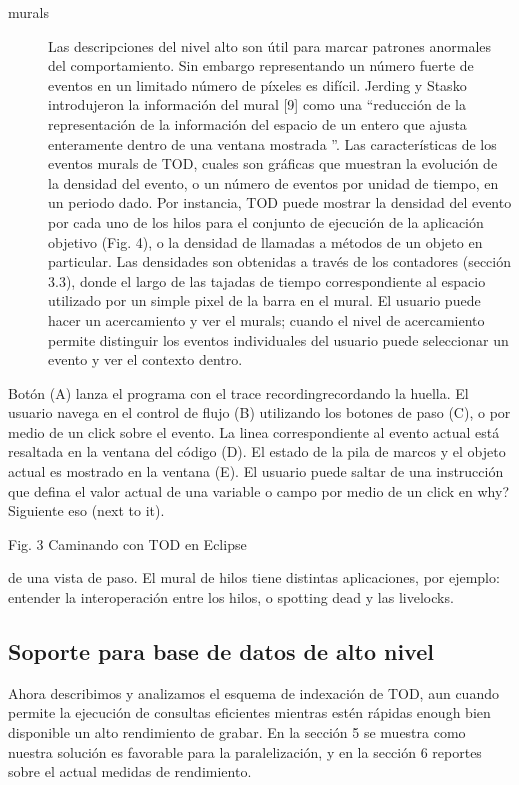\documentclass[12pt,legalpaper]{report}
\begin{document}
\begin{description}
	\item[murals] Las descripciones del nivel alto son útil para marcar patrones anormales del comportamiento.  Sin embargo representando un número fuerte de eventos en un limitado número de píxeles es difícil.  Jerding y Stasko introdujeron la información del mural [9] como una “reducción de la representación de la información del espacio de un entero que ajusta enteramente dentro de una ventana mostrada ”.  Las características de los eventos murals de TOD, cuales son gráficas que muestran la evolución de la densidad del evento, o un número de eventos por unidad de tiempo, en un periodo dado.  Por instancia, TOD puede mostrar la densidad del evento por cada uno de los hilos para el conjunto de ejecución de la aplicación objetivo (Fig. 4), o la densidad de llamadas a métodos de un objeto en particular.  Las densidades son obtenidas a través  de los contadores (sección 3.3), donde el largo de las tajadas de tiempo correspondiente al espacio utilizado por un simple pixel de la barra en el mural.  El usuario puede hacer un acercamiento y ver el murals;  cuando el nivel de acercamiento permite distinguir los eventos individuales del usuario puede seleccionar un evento y ver el contexto dentro.
\end{description}

Botón (A) lanza el programa con el trace recording{recordando la huella}.  El usuario navega en el control de flujo (B) utilizando los botones de paso (C), o por medio de un click sobre el evento.  La linea correspondiente al evento actual está resaltada en la ventana del código (D).  El estado de la pila de marcos y el objeto actual es mostrado en la ventana (E).  El usuario puede saltar de una instrucción que defina el valor actual de una variable o campo por medio de un click en why? Siguiente eso (next to it).


Fig. 3 Caminando con TOD en Eclipse

de una vista de paso.  El mural de hilos tiene distintas aplicaciones, por ejemplo: entender la interoperación entre los hilos, o spotting dead y las livelocks.

		\subsection{Soporte para base de datos de alto nivel}

Ahora describimos y analizamos el esquema de indexación de TOD, aun cuando permite la ejecución de consultas eficientes mientras estén rápidas enough {bien} disponible un alto rendimiento de grabar.  En la sección 5 se muestra como nuestra solución es favorable para la paralelización, y en la sección 6 reportes sobre el actual medidas de rendimiento.
\end{document}
